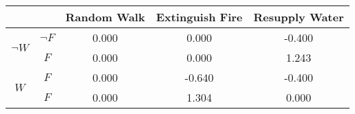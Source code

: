 \begin{center}
\begin{tabular}{|c|c|c|c|c|}
  \hline
  &   & Random Walk & Extinguish Fire & Resupply Water\\
  \hline
  \multirow{2}{*}{$\neg W$} & $\neg F$ & 0.000 & 0.000 & -0.400\\
  \cline{2-5}
   & $F$ & 0.000 & 0.000 & 1.243\\
  \hline
  \multirow{2}{*}{$W$} & $F$ & 0.000 & -0.640 & -0.400\\
  \cline{2-5}
   & $F$ & 0.000 & 1.304 & 0.000\\
  \hline
\end{tabular}
\end{center}
